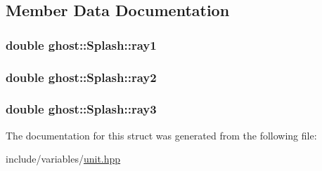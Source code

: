 \subsection{Member Data Documentation}
\hypertarget{structghost_1_1Splash_a283c04c8236bb2763dc8de33764cce7d}{
\subsubsection[{ray1}]{\setlength{\rightskip}{0pt plus 5cm}double ghost\-::\-Splash\-::ray1}}\label{structghost_1_1Splash_a283c04c8236bb2763dc8de33764cce7d}
\hypertarget{structghost_1_1Splash_ae5b63d9f92f4c1f19e24c4a0879512e9}{
\subsubsection[{ray2}]{\setlength{\rightskip}{0pt plus 5cm}double ghost\-::\-Splash\-::ray2}}\label{structghost_1_1Splash_ae5b63d9f92f4c1f19e24c4a0879512e9}
\hypertarget{structghost_1_1Splash_a2f90ec4779df2286e16d23fedb724fa3}{
\subsubsection[{ray3}]{\setlength{\rightskip}{0pt plus 5cm}double ghost\-::\-Splash\-::ray3}}\label{structghost_1_1Splash_a2f90ec4779df2286e16d23fedb724fa3}


The documentation for this struct was generated from the following file\-:\begin{DoxyCompactItemize}
\item 
include/variables/\hyperlink{unit_8hpp}{unit.\-hpp}\end{DoxyCompactItemize}
